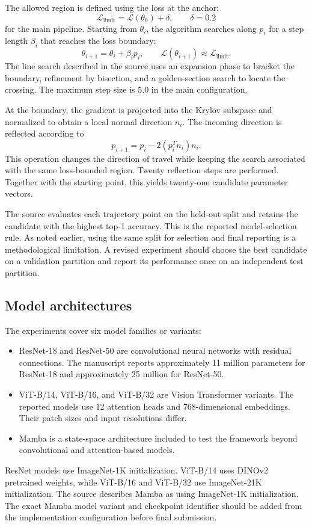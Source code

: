\documentclass[11pt,a4paper]{article}
\begin{document}
The allowed region is defined using the loss at the anchor:
\begin{equation}
 \mathcal{L}_{\mathrm{limit}}=\mathcal{L}(\theta_0)+\delta,
 \qquad \delta=0.2
 \label{eq:loss_limit}
\end{equation}
for the main pipeline. Starting from $\theta_i$, the algorithm searches along $p_i$ for a step length $\beta_i$ that reaches the loss boundary:
\begin{equation}
 \theta_{i+1}=\theta_i+\beta_i p_i,
 \qquad
 \mathcal{L}(\theta_{i+1})\approx\mathcal{L}_{\mathrm{limit}}.
 \label{eq:boa_step}
\end{equation}
The line search described in the source uses an expansion phase to bracket the boundary, refinement by bisection, and a golden-section search to locate the crossing. The maximum step size is 5.0 in the main configuration.

At the boundary, the gradient is projected into the Krylov subspace and normalized to obtain a local normal direction $n_i$. The incoming direction is reflected according to
\begin{equation}
 p_{i+1}=p_i-2(p_i^Tn_i)n_i.
 \label{eq:boa_reflection}
\end{equation}
This operation changes the direction of travel while keeping the search associated with the same loss-bounded region. Twenty reflection steps are performed. Together with the starting point, this yields twenty-one candidate parameter vectors.

The source evaluates each trajectory point on the held-out split and retains the candidate with the highest top-1 accuracy. This is the reported model-selection rule. As noted earlier, using the same split for selection and final reporting is a methodological limitation. A revised experiment should choose the best candidate on a validation partition and report its performance once on an independent test partition.

\subsection{Model architectures}
The experiments cover six model families or variants:
\begin{itemize}
 \item ResNet-18 and ResNet-50 are convolutional neural networks with residual connections. The manuscript reports approximately 11 million parameters for ResNet-18 and approximately 25 million for ResNet-50.
 \item ViT-B/14, ViT-B/16, and ViT-B/32 are Vision Transformer variants. The reported models use 12 attention heads and 768-dimensional embeddings. Their patch sizes and input resolutions differ.
 \item Mamba is a state-space architecture included to test the framework beyond convolutional and attention-based models.
\end{itemize}
ResNet models use ImageNet-1K initialization. ViT-B/14 uses DINOv2 pretrained weights, while ViT-B/16 and ViT-B/32 use ImageNet-21K initialization. The source describes Mamba as using ImageNet-1K initialization. The exact Mamba model variant and checkpoint identifier should be added from the implementation configuration before final submission.
\end{document}
